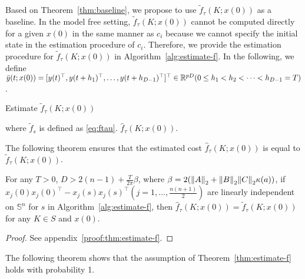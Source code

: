 Based on Theorem~\ref{thm:baseline}, we propose to use $\tilde f_\tau(K;x(0))$ as a baseline.
In the model free setting, $\tilde f_\tau(K;x(0))$ cannot be computed directly for a given $x(0)$ in the same manner as $c_i$ because we cannot specify the initial state in the estimation procedure of $c_i$.
Therefore, we provide the estimation procedure for $\tilde f_\tau(K;x(0))$ in Algorithm~\ref{alg:estimate-f}. In the following, we define $\bar{y}(t;x(0)) = [y(t)^\top, y(t+h_1)^\top, \dots, y(t+h_{D-1})^\top]^\top \in \mathbb{R}^{pD}(0\leq h_1<h_2<\dots<h_{D-1}=T)$.
\begin{algorithm}
  \caption{Estimate $\tilde f_{\tau}(K;x(0))$}
  \label{alg:estimate-f}
  \begin{algorithmic}[1]
    \ENDFOR
    where $\tilde f_s$ is defined as \eqref{eq:ftau}.
    \RETURN $\hat f_\tau(K;x(0))$.
  \end{algorithmic}
\end{algorithm}
The following theorem ensures that the estimated cost $\hat f_\tau(K;x(0))$ is equal to $\tilde f_\tau(K;x(0))$.
\begin{theorem}\label{thm:estimate-f}
  For any $T > 0$, $D > 2(n-1) + \frac{T}{2\pi} \beta$, where $\beta = 2(\norm{A}_2 + \norm{B}_2\norm{C}_2\kappa(a))$,
  if $x_j(0)x_j(0)^\top - x_j(s)x_j(s)^\top(j=1, \dots, \frac{n(n+1)}{2})$
  are linearly independent on $\mathbb{S}^n$ for $s$ in Algorithm~\ref{alg:estimate-f}, then $\hat f_\tau(K;x(0)) = \tilde f_\tau(K;x(0))$ for any $K \in S$ and $x(0)$.
\end{theorem}
\begin{proof}
  See appendix~\ref{proof:thm:estimate-f}.
\end{proof}

The following theorem shows that
the assumption of Theorem~\ref{thm:estimate-f} holds with probability 1.

